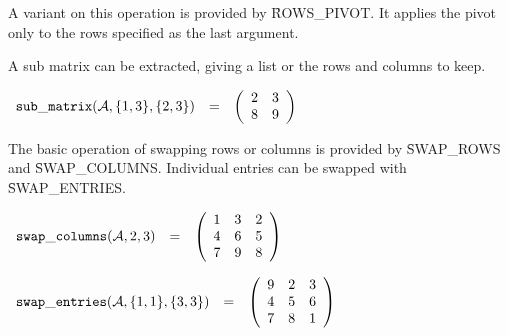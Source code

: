 A variant on this operation is provided by
\f{ROWS\_PIVOT}.  It applies the pivot only to the
rows specified as the last argument.

A sub matrix can be extracted, giving a list or the rows and columns
to keep.

\begin{flushleft}  
\hspace*{0.1in}
\begin{math}  
\begin{array}{ccc}
{\tt sub\_matrix}({\cal A},\{1,3\},\{2,3\}) & = & 
        \left( \begin{array}{cc} 2 & 3 \\ 8 & 9
 \end{array} \right) 
\end{array}
\end{math}  
\end{flushleft}

The basic operation of swapping rows or columns is provided by
\f{SWAP\_ROWS} and
\f{SWAP\_COLUMNS}.  Individual entries can be
swapped with \f{SWAP\_ENTRIES}.
\begin{flushleft}  
\hspace*{0.1in}
\begin{math}  
\begin{array}{ccc}
{\tt swap\_columns}({\cal A},2,3) & = & 
        \left( \begin{array}{ccc} 1 & 3 & 2 \\ 4 & 6 & 5 \\ 7 & 9 & 8
 \end{array} \right) 
\end{array}
\end{math}  
\end{flushleft}

\begin{flushleft}  
\hspace*{0.1in}
\begin{math}  
\begin{array}{ccc}
{\tt swap\_entries}({\cal A},\{1,1\},\{3,3\}) & = & 
        \left( \begin{array}{ccc} 9 & 2 & 3 \\ 4 & 5 & 6 \\ 7 & 8 & 1
 \end{array} \right) 
\end{array}
\end{math}  
\end{flushleft}


